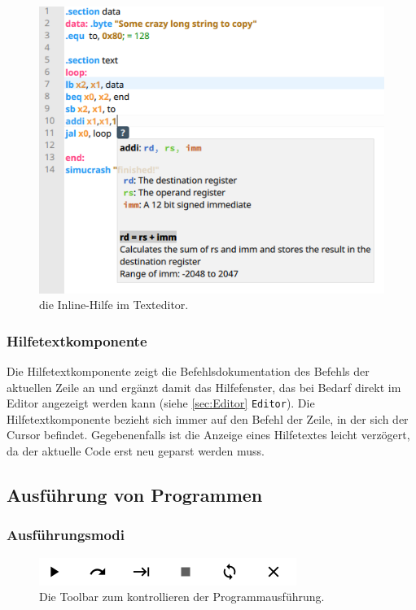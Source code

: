 \begin{figure}[ht]
	\centering
  \includegraphics[scale=0.7]{Images/Editor_help}
	\caption{die Inline-Hilfe im Texteditor.}
	\label{Editor_Help}
\end{figure}




\subsubsection{Hilfetextkomponente}
\label{help-component}

Die Hilfetextkomponente zeigt die Befehlsdokumentation des Befehls der aktuellen
Zeile an und ergänzt damit das Hilfefenster, das bei Bedarf direkt im Editor
angezeigt werden kann (siehe \ref{sec:Editor} \texttt{Editor}). Die
Hilfetextkomponente bezieht sich immer auf den Befehl der Zeile, in der sich der
Cursor befindet. Gegebenenfalls ist die Anzeige eines Hilfetextes leicht
verzögert, da der aktuelle Code erst neu geparst werden muss.


\subsection{Ausführung von Programmen}

\subsubsection{Ausführungsmodi}

\begin{figure}[ht]
	\centering
  \includegraphics[scale=1]{Images/Toolbar}
	\caption{Die Toolbar zum kontrollieren der Programmausführung.}
	\label{Toolbar}
\end{figure}


